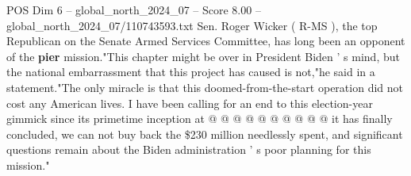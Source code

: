 \begin{textsample}{POS Dim 6 – global\_north\_2024\_07 – Score 8.00 – global\_north\_2024\_07/110743593.txt}
Sen.
Roger Wicker ( R-MS ), the top Republican on the Senate Armed Services Committee, has long been an opponent of the \textbf{pier} mission."This chapter might be over in President Biden ' s mind, but the national embarrassment that this project has caused is not,"he said in a statement."The only miracle is that this doomed-from-the-start operation did not cost any American lives.
I have been calling for an end to this election-year gimmick since its primetime inception at @ @ @ @ @ @ @ @ @ @ it has finally concluded, we can not buy back the \$230 million needlessly spent, and significant questions remain about the Biden administration ' s poor planning for this mission."

\end{textsample}

